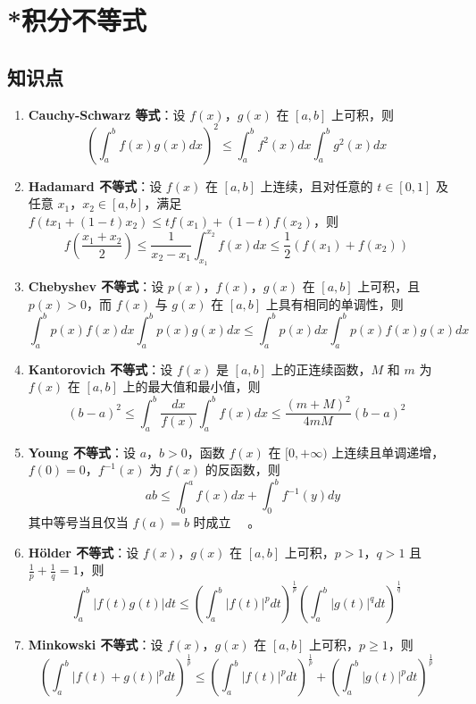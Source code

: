 \documentclass[UTF8]{ctexart}
\theoremstyle{remark}
\begin{document}
\section{*积分不等式}
\subsection*{知识点}
\begin{enumerate}
	\item \textbf{Cauchy-Schwarz 等式}：设 \(f(x)\)，\(g(x)\) 在 \([a,b]\) 上可积，则
	\[
	\left(\int_{a}^{b} f(x) g(x) d x\right)^{2} \leq \int_{a}^{b} f^{2}(x) d x \int_{a}^{b} g^{2}(x) d x \quad \text{}
	\]
	
	\item \textbf{Hadamard 不等式}：设 \(f(x)\) 在 \([a, b]\) 上连续，且对任意的 \(t \in[0,1]\) 及任意 \(x_{1}\)，\(x_{2} \in[a, b]\)，满足 \(f(t x_{1}+(1-t) x_{2}) \leq t f(x_{1})+(1-t) f(x_{2})\)，则
	\[
	f\left(\frac{x_{1}+x_{2}}{2}\right) \leq \frac{1}{x_{2}-x_{1}} \int_{x_{1}}^{x_{2}} f(x) d x \leq \frac{1}{2}\left(f\left(x_{1}\right)+f\left(x_{2}\right)\right) \quad \text{}
	\]
	
	\item \textbf{Chebyshev 不等式}：设 \(p(x)\)，\(f(x)\)，\(g(x)\) 在 \([a, b]\) 上可积，且 \(p(x)>0\)，而 \(f(x)\) 与 \(g(x)\) 在 \([a, b]\) 上具有相同的单调性，则
	\[
	\int_{a}^{b} p(x) f(x) d x \int_{a}^{b} p(x) g(x) d x \leq \int_{a}^{b} p(x) d x \int_{a}^{b} p(x) f(x) g(x) d x \quad \text{}
	\]
	
	\item \textbf{Kantorovich 不等式}：设 \(f(x)\) 是 \([a, b]\) 上的正连续函数，\(M\) 和 \(m\) 为 \(f(x)\) 在 \([a, b]\) 上的最大值和最小值，则
	\[
	(b-a)^{2} \leq \int_{a}^{b} \frac{d x}{f(x)} \int_{a}^{b} f(x) d x \leq \frac{(m+M)^{2}}{4 m M}(b-a)^{2} \quad \text{}
	\]
	
	\item \textbf{Young 不等式}：设 \(a\)，\(b>0\)，函数 \(f(x)\) 在 \([0,+\infty)\) 上连续且单调递增，\(f(0)=0\)，\(f^{-1}(x)\) 为 \(f(x)\) 的反函数，则
	\[
	a b \leq \int_{0}^{a} f(x) d x+\int_{0}^{b} f^{-1}(y) d y
	\]
	其中等号当且仅当 \(f(a)=b\) 时成立 \(\quad \text{}\)。
	
	\item \textbf{Hölder 不等式}：设 \(f(x)\)，\(g(x)\) 在 \([a, b]\) 上可积，\(p>1\)，\(q>1\) 且 \(\frac{1}{p}+\frac{1}{q}=1\)，则
	\[
	\int_{a}^{b}|f(t) g(t)| d t \leq\left(\int_{a}^{b}|f(t)|^{p} d t\right)^{\frac{1}{p}}\left(\int_{a}^{b}|g(t)|^{q} d t\right)^{\frac{1}{q}} \quad \text{}
	\]
	
	\item \textbf{Minkowski 不等式}：设 \(f(x)\)，\(g(x)\) 在 \([a, b]\) 上可积，\(p \geq 1\)，则
	\[
	\left(\int_{a}^{b}|f(t)+g(t)|^{p} d t\right)^{\frac{1}{p}} \leq\left(\int_{a}^{b}|f(t)|^{p} d t\right)^{\frac{1}{p}}+\left(\int_{a}^{b}|g(t)|^{p} d t\right)^{\frac{1}{p}} \quad \text{}
	\]
\end{enumerate}
\end{document}
